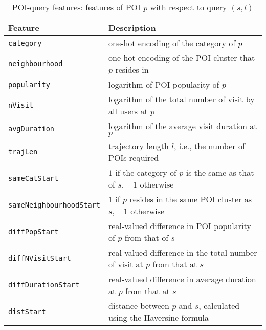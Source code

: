 \begin{table*}[!h]
\caption{POI-query features: features of POI $p$ with respect to query $(s,l)$}
\label{tab:poifeature}
\centering
\small
\setlength{\tabcolsep}{10pt} %
\begin{tabular}{l|l} \hline
\textbf{Feature}       & \textbf{Description} \\ \hline
\texttt{category}      & one-hot encoding of the category of $p$ \\
\texttt{neighbourhood} & one-hot encoding of the POI cluster that $p$ resides in \\
\texttt{popularity}    & logarithm of POI popularity of $p$ \\
\texttt{nVisit}        & logarithm of the total number of visit by all users at $p$ \\
\texttt{avgDuration}  & logarithm of the average visit duration at $p$ \\
\hline

\texttt{trajLen}           & trajectory length $l$, i.e., the number of POIs required \\
\texttt{sameCatStart}      & $1$ if the category of $p$ is the same as that of $s$, $-1$ otherwise \\
\texttt{sameNeighbourhoodStart} & $1$ if $p$ resides in the same POI cluster as $s$, $-1$ otherwise \\
\texttt{diffPopStart}    & real-valued difference in POI popularity of $p$ from that of $s$ \\
\texttt{diffNVisitStart}        & real-valued difference in the total number of visit at $p$ from that at $s$ \\
\texttt{diffDurationStart}  & real-valued difference in average duration at $p$ from that at $s$ \\
\texttt{distStart}          & distance between $p$ and $s$, calculated using the Haversine formula \\
\hline
\end{tabular}
\end{table*}



